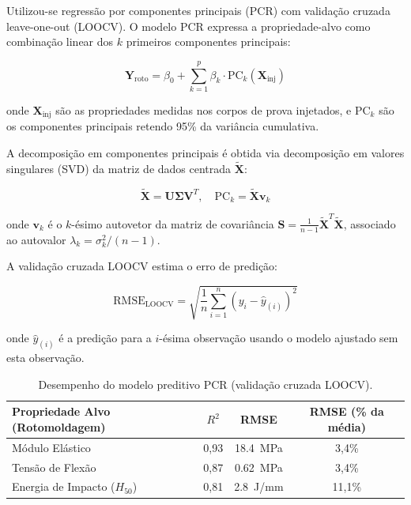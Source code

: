 \documentclass[12pt,a4paper,twoside]{article}
\begin{document}
Utilizou-se regressão por componentes principais (PCR) com validação cruzada leave-one-out (LOOCV). O modelo PCR expressa a propriedade-alvo como combinação linear dos $k$ primeiros componentes principais:

\begin{equation}
\mathbf{Y}_{\text{roto}} = \beta_0 + \sum_{k=1}^{p} \beta_k \cdot \text{PC}_k(\mathbf{X}_{\text{inj}})
\label{eq:pcr}
\end{equation}

onde $\mathbf{X}_{\text{inj}}$ são as propriedades medidas nos corpos de prova injetados, e $\text{PC}_k$ são os componentes principais retendo 95\% da variância cumulativa.

A decomposição em componentes principais é obtida via decomposição em valores singulares (SVD) da matriz de dados centrada $\tilde{\mathbf{X}}$:

\begin{equation}
\tilde{\mathbf{X}} = \mathbf{U} \boldsymbol{\Sigma} \mathbf{V}^T, \quad \text{PC}_k = \tilde{\mathbf{X}} \mathbf{v}_k
\label{eq:svd}
\end{equation}

onde $\mathbf{v}_k$ é o $k$-ésimo autovetor da matriz de covariância $\mathbf{S} = \frac{1}{n-1}\tilde{\mathbf{X}}^T\tilde{\mathbf{X}}$, associado ao autovalor $\lambda_k = \sigma_k^2 / (n-1)$.

A validação cruzada LOOCV estima o erro de predição:

\begin{equation}
\text{RMSE}_{\text{LOOCV}} = \sqrt{\frac{1}{n} \sum_{i=1}^{n} (y_i - \hat{y}_{(i)})^2}
\label{eq:loocv}
\end{equation}

onde $\hat{y}_{(i)}$ é a predição para a $i$-ésima observação usando o modelo ajustado sem esta observação.

\begin{table}[H]
\centering
\caption{Desempenho do modelo preditivo PCR (validação cruzada LOOCV).}
\label{tab:pcr_model}
\begin{tabular}{lccc}
\toprule
\textbf{Propriedade Alvo (Rotomoldagem)} & \textbf{$R^2$} & \textbf{RMSE} & \textbf{RMSE (\% da média)} \\
\midrule
Módulo Elástico      & 0,93 & \SI{18,4}{MPa} & 3,4\% \\
Tensão de Flexão     & 0,87 & \SI{0,62}{MPa} & 3,4\% \\
Energia de Impacto ($H_{50}$) & 0,81 & \SI{2,8}{J/mm} & 11,1\% \\
\bottomrule
\end{tabular}
\end{table}
\end{document}
